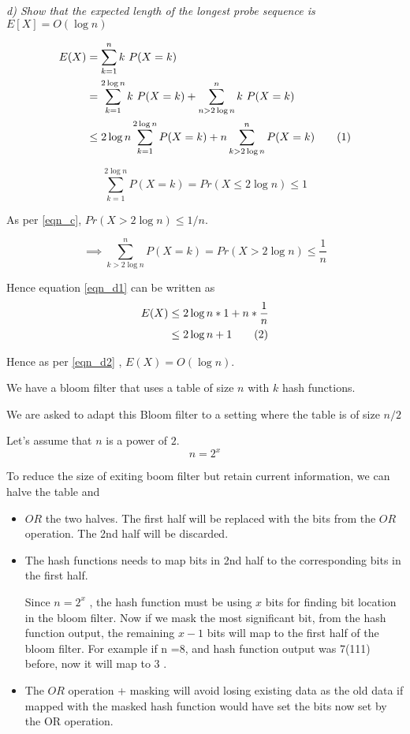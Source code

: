 \documentclass{homeworg}
\newcommand\numberthis{\addtocounter{equation}{1}\tag{\theequation}}
\begin{document}
\emph{d) Show that the expected length of the longest probe sequence is $E[X]= O(\log n)$}

\begin{align*}
    E(X) &= \sum_{k=1}^n k \ P(X=k)\\
    &= \sum_{k=1}^{2 \log n} k \ P(X=k) + \sum_{n > 2 \log n }^n k \ P(X=k)\\
    &\le 2 \log n \sum_{k=1}^{2\log n} P(X=k) + n \sum_{k > 2\log n}^n P(X=k) \numberthis \label{eqn_d1}
\end{align*}

\[
    \sum_{k=1}^{2\log n} P(X=k) = Pr({X\le 2 \log n}) \le 1
\]

As per \ref{eqn_c}, $Pr({X> 2 \log n}) \le 1/n$.

\[
    \implies \sum_{k > 2\log n}^n P(X=k) = Pr({X> 2 \log n}) \le \frac{1}{n}
\]


Hence equation \ref{eqn_d1} can be written as
\begin{align*}
    E(X) &\le 2 \log n \ast 1 +n \ast \frac{1}{n}\\
    &\le 2\log n +1 \numberthis\label{eqn_d2}
\end{align*}

Hence as per \ref{eqn_d2} ,     $E(X) = O(\log n)$.

\newpage
\exercise
We have a bloom filter that uses a table of size $n$ with $k$ hash functions.

We are asked to adapt this Bloom filter to a setting where the table is of size $n/2$

Let's assume that $n$ is a power of $2$.
\[
    n = 2^x
\]

To reduce the size of exiting boom filter but retain current information, we can halve the table and 
\begin{itemize}
    \item $OR$ the two halves. The first half will be replaced with the bits from the $OR$ operation. The 2nd half will be discarded.
    \item The hash functions needs to map bits in 2nd half to the corresponding bits in the first half. 
    
    Since $n=2^x$ , the hash function must be using $x$ bits for finding bit location in the bloom filter. Now if we mask the most significant bit, from the hash function output, the remaining $x-1$ bits will map to the first half of the bloom filter. For example if n =8, and hash function output was 7(111) before, now it will map to 3 .
    \item The $OR$ operation + masking will avoid losing existing data as the old data if mapped with the masked hash function would have set the bits now set by the OR operation.
\end{itemize}
\end{document}
